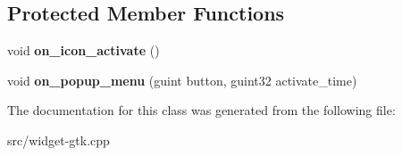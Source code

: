 \subsection*{\-Protected \-Member \-Functions}
\begin{DoxyCompactItemize}
\item 
\hypertarget{classgtkTrayIcon_a3ea84d1f210235d873955533114693ea}{void {\bfseries on\-\_\-icon\-\_\-activate} ()}\label{classgtkTrayIcon_a3ea84d1f210235d873955533114693ea}

\item 
\hypertarget{classgtkTrayIcon_a56a739d3cd648fbb36ff2edbd3f1c336}{void {\bfseries on\-\_\-popup\-\_\-menu} (guint button, guint32 activate\-\_\-time)}\label{classgtkTrayIcon_a56a739d3cd648fbb36ff2edbd3f1c336}

\end{DoxyCompactItemize}


\-The documentation for this class was generated from the following file\-:\begin{DoxyCompactItemize}
\item 
src/widget-\/gtk.\-cpp\end{DoxyCompactItemize}
